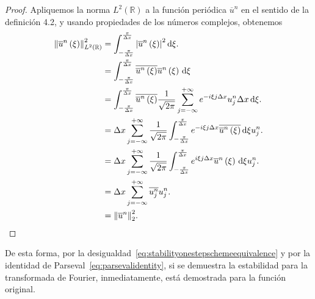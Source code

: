 \begin{proof}
  Apliquemos la norma $L^{2}\left(\mathbb{R}\right)$ a la función
  periódica $\overline{u}^{n}$ en el sentido de la definición 4.2, y
  usando propiedades de los números complejos, obtenemos
  \begin{align*}
    {\left\|
      \overline{u}^{n}
      \left(\xi\right)
    \right\|}^{2}_{L^{2}\left(\mathbb{R}\right)} & =
    \int_{-\frac{\pi}{\Delta x}}^{\frac{\pi}{\Delta x}}
    {\left|
      \overline{u}^{n}
      \left(\xi\right)
      \right|}^{2}
    \dl\xi.                                          \\
                                                 & =
    \int_{-\frac{\pi}{\Delta x}}^{\frac{\pi}{\Delta x}}
    \overline{\overline{u}^{n}\left(\xi\right)}
    \overline{u}^{n}
    \left(\xi\right)
    \dl\xi                                           \\
                                                 & =
    \int_{-\frac{\pi}{\Delta x}}^{\frac{\pi}{\Delta x}}
    \overline{\overline{u}^{n}\left(\xi\right)}
    \frac{1}{\sqrt{2\pi}}
    \sum_{j=-\infty}^{+\infty}
    e^{-i\xi j\Delta x}
    u^{n}_{j}
    \Delta x
    \dl\xi.                                          \\
                                                 & =
    \Delta x
    \sum_{j=-\infty}^{+\infty}
    \frac{1}{\sqrt{2\pi}}
    \int_{-\frac{\pi}{\Delta x}}^{\frac{\pi}{\Delta x}}
    e^{-i\xi j \Delta x}
    \overline{\overline{u}^{n}\left(\xi\right)}
    \dl\xi
    u^{n}_{j}.                                       \\
                                                 & =
    \Delta x
    \sum_{j=-\infty}^{+\infty}
    \frac{1}{\sqrt{2\pi}}
    \int_{-\frac{\pi}{\Delta x}}^{\frac{\pi}{\Delta x}}
    e^{i\xi j \Delta x}
    \overline{u}^{n}
    \left(\xi\right)
    \dl\xi
    u^{n}_{j}.                                       \\
                                                 & =
    \Delta x
    \sum_{j=-\infty}^{+\infty}
    \overline{u^{n}_{j}}
    u^{n}_{j}.                                       \\
                                                 & =
    {\left\|\overline{u}^{n}\right\|}^{2}_{2}.
  \end{align*}
\end{proof}

De esta forma, por la
desigualdad~\eqref{eq:stabilityonestepschemeequivalence} y por la
identidad de Parseval~\eqref{eq:parsevalidentity}, si se demuestra la
estabilidad para la transformada de Fourier, inmediatamente, está
demostrada para la función original.

